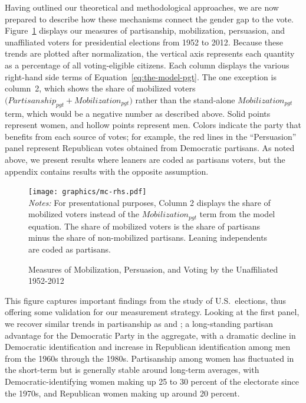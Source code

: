 \documentclass[12pt
               ,final
               ]{article}
\newcommand{\notes}[1]{\\
\small
\emph{Notes:} #1}
\begin{document}
Having outlined our theoretical and methodological approaches, we are now prepared to describe how these mechanisms connect the gender gap to the vote. Figure~\ref{fig:RHS-simple} displays our measures of partisanship, mobilization, persuasion, and unaffiliated voters for presidential elections from 1952 to 2012. Because these trends are plotted after normalization, the vertical axis represents each quantity as a percentage of all voting-eligible citizens. Each column displays the various right-hand side terms of Equation~\ref{eq:the-model-pgt}. The one exception is column~2, which shows the share of mobilized voters $\big(\mathit{Partisanship}_{pgt} + \mathit{Mobilization}_{pgt}\big)$ rather than the stand-alone $\mathit{Mobilization}_{pgt}$ term, which would be a negative number as described above. Solid points represent women, and hollow points represent men. Colors indicate the party that benefits from each source of votes; for example, the red lines in the ``Persuasion'' panel represent Republican votes obtained from Democratic partisans. As noted above, we present results where leaners are coded as partisans voters, but the appendix contains results with the opposite assumption.


\begin{figure}[hbt]
  \centering
  \caption{Measures of Mobilization, Persuasion, and Voting by the Unaffiliated 1952-2012}
  \texttt{[image: graphics/mc-rhs.pdf]}
  \label{fig:RHS-simple}
  \notes{For presentational purposes, Column 2 displays the share of mobilized voters instead of the $\mathit{Mobilization}_{pgt}$ term from the model equation. The share of mobilized voters is the share of partisans minus the share of non-mobilized partisans. Leaning independents are coded as partisans.}
\end{figure}


This figure captures important findings from the study of U.S.\ elections, thus offering some validation for our measurement strategy. Looking at the first panel, we recover similar trends in partisanship as \citet{kaufmann1999changing} and \citet{norrander1997independence}; a long-standing partisan advantage for the Democratic Party in the aggregate, with a dramatic decline in Democratic identification and increase in Republican identification among men from the 1960s through the 1980s. Partisanship among women has fluctuated in the short-term but is generally stable around long-term averages, with Democratic-identifying women making up 25 to 30 percent of the electorate since the 1970s, and Republican women making up around 20 percent.
\end{document}
